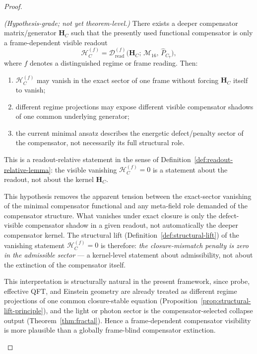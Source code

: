 \begin{proof}
\begin{proposition}
\label{hyp:frame-dependent-defect-readout}
\emph{(Hypothesis-grade; not yet theorem-level.)}
There exists a deeper compensator matrix/generator $\mathbf{H}_C$ such
that the presently used functional compensator is only a frame-dependent
visible readout
\[
  \mathcal{H}_C^{(f)}
  =
  \mathcal{D}_{\mathrm{read}}^{(f)}
  \bigl(\mathbf{H}_C;\,\mathcal{M}_{16},\,\hat P_{C_7}\bigr),
\]
where $f$ denotes a distinguished regime or frame reading. Then:
\begin{enumerate}[label=(\roman*)]
  \item $\mathcal{H}_C^{(f)}$ may vanish in the exact sector of one
        frame without forcing $\mathbf{H}_C$ itself to vanish;
  \item different regime projections may expose different visible
        compensator shadows of one common underlying generator;
  \item the current minimal ansatz describes the energetic defect/penalty
        sector of the compensator, not necessarily its full structural role.
\end{enumerate}
This is a readout-relative statement in the sense of
Definition~\ref{def:readout-relative-lemma}: the visible vanishing
$\mathcal{H}_C^{(f)} = 0$ is a statement about the readout, not about
the kernel $\mathbf{H}_C$.
\end{proposition}

\begin{remark}
This hypothesis removes the apparent tension between the exact-sector
vanishing of the minimal compensator functional and any meta-field role
demanded of the compensator structure. What vanishes under exact closure
is only the defect-visible compensator shadow in a given readout, not
automatically the deeper compensator kernel. The structural lift
(Definition~\ref{def:structural-lift}) of the vanishing statement
$\mathcal{H}_C^{(f)} = 0$ is therefore: \emph{the closure-mismatch
penalty is zero in the admissible sector} --- a kernel-level statement
about admissibility, not about the extinction of the compensator itself.
\end{remark}

\begin{remark}
This interpretation is structurally natural in the present framework,
since probe, effective QFT, and Einstein geometry are already treated as
different regime projections of one common closure-stable equation
(Proposition~\ref{prop:structural-lift-principle}), and the light or
photon sector is the compensator-selected collapse output
(Theorem~\ref{thm:fractal}). Hence a frame-dependent compensator
visibility is more plausible than a globally frame-blind compensator
extinction.
\end{remark}


\end{proof}
